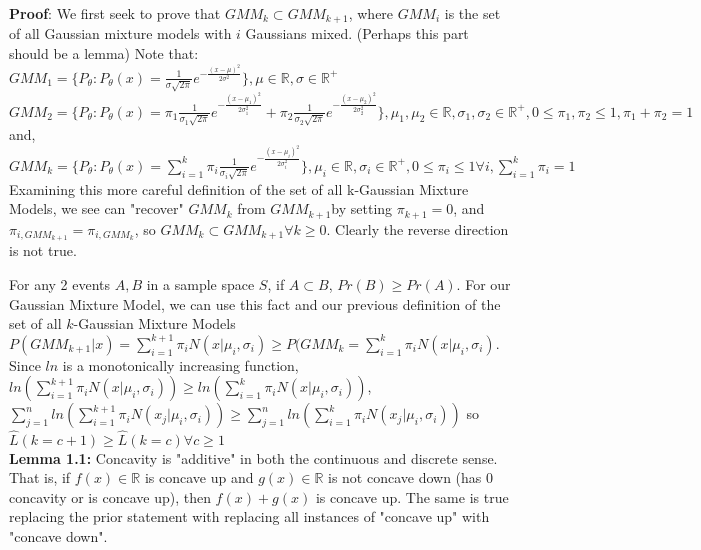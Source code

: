 \documentclass{article}
\begin{document}
\textbf{Proof}: We first seek to prove that \(GMM_k \subset GMM_{k+1}\), where  \(GMM_i\) is the set of all Gaussian mixture models with \(i\) Gaussians mixed. (Perhaps this part should be a lemma) Note that:\\
\(GMM_1  = \{P_{\theta} : P_{\theta}(x) = \frac{1}{\sigma \sqrt{2\pi}} e^{ - \frac{(x - \mu)^2}{2\sigma^2}} \}, \mu \in \mathbb{R}, \sigma \in \mathbb{R}^+\)\\
\(GMM_2 = \{P_{\theta} : P_{\theta}(x) = \pi_1 \frac{1}{\sigma_1 \sqrt{2\pi}} e^{ - \frac{(x - \mu_1)^2}{2\sigma_1^2}} + \pi_2 \frac{1}{\sigma_2 \sqrt{2\pi}} e^{ - \frac{(x - \mu_2)^2}{2\sigma_2^2}} \}, \mu_1, \mu_2 \in \mathbb{R}, \sigma_1, \sigma_2 \in \mathbb{R}^+ , 0 \leq \pi_1, \pi_2 \leq 1, \pi_1 + \pi_2 = 1\)\\
and, 
\(GMM_k = \{P_{\theta} : P_{\theta}(x) = \sum_{i=1}^k \pi_i \frac{1}{\sigma_i \sqrt{2\pi}} e^{ - \frac{(x - \mu_i)^2}{2\sigma_i^2}}  \}, \mu_i \in \mathbb{R}, \sigma_i \in \mathbb{R}^+ , 0 \leq \pi_i \leq 1\forall i, \sum_{i=1}^k \pi_i = 1\)\\

Examining this more careful definition of the set of all k-Gaussian Mixture Models, we see can "recover" \(GMM_k\) from \(GMM_{k+1}\)by setting \(\pi_{k+1} = 0\), and \(\pi_{i, GMM_{k+1}} = \pi_{i, GMM_k}\), so \(GMM_k \subset GMM_{k+1} \forall k \geq 0\). Clearly the reverse direction is not true.

For any 2 events \(A, B\) in a sample space \(S\), if \(A \subset B\), \(Pr(B) \geq Pr(A)\). For our Gaussian Mixture Model, we can use this fact and our previous definition of the set of all \(k\)-Gaussian Mixture Models \(P(GMM_{k+1} | x) =  \sum_{i=1}^{k+1} \pi_i N(x | \mu_i, \sigma_i) \geq P(GMM_{k}  =  \sum_{i=1}^k \pi_i N(x | \mu_i, \sigma_i)\). Since \(ln\) is a monotonically increasing function,  \(ln(\sum_{i=1}^{k+1} \pi_i N(x | \mu_i, \sigma_i)) \geq  ln(\sum_{i=1}^k \pi_i N(x | \mu_i, \sigma_i))\), \\
 \( \sum_{j=1}^n ln (\sum_{i=1}^{k+1} \pi_i N(x_j | \mu_i, \sigma_i) )\geq  \sum_{j=1}^n ln (\sum_{i=1}^{k} \pi_i N(x_j | \mu_i, \sigma_i) )\) so \(\hat{L}(k = c+1) \geq \hat{L}(k = c) \forall c\geq 1 \)\\
 
 \textbf{Lemma 1.1:} Concavity is "additive" in both the continuous and discrete sense. That is, if \(f(x) \in \mathbb{R}\) is concave up and \(g(x) \in \mathbb{R}\) is not concave down (has $0$ concavity or is concave up), then \(f(x) + g(x)\) is concave up. The same is true replacing the prior statement with replacing all instances of "concave up" with "concave down".
 
\end{document}
